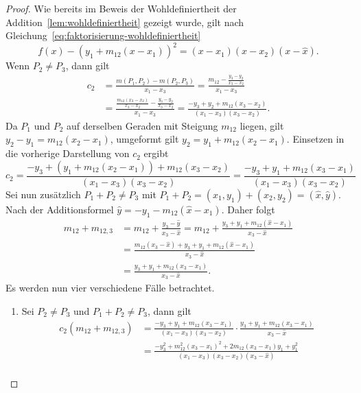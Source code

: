 \begin{proof}
    Wie bereits im Beweis der Wohldefiniertheit der Addition~\ref{lem:wohldefiniertheit} gezeigt wurde, gilt nach Gleichung~\eqref{eq:faktorisierung-wohldefiniertheit}
    \[
        f(x)-{\left(y_1+m_{12}(x-x_1)\right)}^2
        =(x-x_1)(x-x_2)(x-\hat{x}).
    \]
    Wenn $P_2\neq P_3$, dann gilt
    \begin{align*}
        c_2 & =\frac{m(P_1,P_2)-m(P_2,P_3)}{x_1-x_3} =\frac{m_{12}-\frac{y_3-y_2}{x_3-x_2}}{x_1-x_3}                                         \\
            & =\frac{\frac{m_{12}(x_3-x_2)}{x_3-x_2}-\frac{y_3-y_2}{x_3-x_2}}{x_1-x_3}= \frac{-y_3+y_2+m_{12}(x_3-x_2)}{(x_1-x_3)(x_3-x_2)}.
    \end{align*}
    Da $P_1$ und $P_2$ auf derselben Geraden mit Steigung $m_{12}$
    liegen, gilt $y_2-y_1=m_{12}(x_2-x_1)$, umgeformt gilt $y_2=y_1+m_{12}(x_2-x_1)$. Einsetzen in die vorherige Darstellung von $c_2$ ergibt
    \[
        c_2=\frac{-y_3+(y_1+m_{12}(x_2-x_1))+m_{12}(x_3-x_2)}{(x_1-x_3)(x_3-x_2)}
        = \frac{-y_3+y_1+m_{12}(x_3-x_1)}{(x_1-x_3)(x_3-x_2)}
    \]
    Sei nun zusätzlich $P_1+P_2\neq P_3$ mit $P_1+P_2= (x_1,y_1) + (x_2,y_2) = (\hat{x},\hat{y})$. Nach der Additionsformel \(\hat{y} =-y_1-m_{12}(\hat{x}-x_1)\). Daher folgt
    \begin{align*}
        m_{12}+m_{12,3}
         & =
        m_{12}
        +
        \frac{y_3-\hat{y}}{x_3-\hat{x}} =
        m_{12}
        +
        \frac{
            y_3+y_1+m_{12}(\hat{x}-x_1)
        }{
            x_3-\hat{x}
        }  \\ &=
        \frac{
            m_{12}(x_3-\hat{x})
            +y_3+y_1+m_{12}(\hat{x}-x_1)
        }{
            x_3-\hat{x}
        } \\ &=
        \frac{
            y_3+y_1+m_{12}(x_3-x_1)
        }{
            x_3-\hat{x}
        }.
    \end{align*}
    Es werden nun vier verschiedene Fälle betrachtet.
    \begin{enumerate}
        \item Sei $P_2\neq P_3$ und $P_1+P_2\neq P_3$, dann gilt
              \begin{align*}
                  c_2(m_{12}+m_{12,3}) & =  \frac{-y_3+y_1+m_{12}(x_3-x_1)}{(x_1-x_3)(x_3-x_2)} \cdot \frac{y_3+y_1+m_{12}(x_3-x_1)}{x_3-\hat{x}}                 \\
                                       & =                       \frac{-y_3^2+m_{12}^2{(x_3-x_1)}^2+2 m_{12}(x_3-x_1)y_1+ y_1^2}{(x_1-x_3)(x_3-x_2)(x_3-\hat{x})} \\

\end{align*}
\end{enumerate}
\end{proof}
